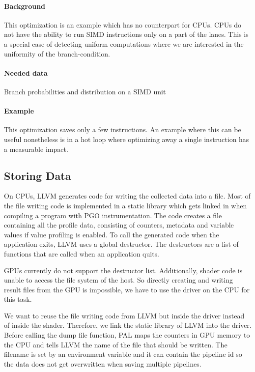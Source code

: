 \paragraph{Background} This optimization is an example which has no counterpart for CPUs. CPUs do not have the ability to run SIMD instructions only on a part of the lanes. This is a special case of detecting uniform computations where we are interested in the uniformity of the branch-condition.
\paragraph{Needed data} Branch probabilities and distribution on a SIMD unit
\paragraph{Example} This optimization saves only a few instructions. An example where this can be useful nonetheless is in a hot loop where optimizing away a single instruction has a measurable impact.

\subsection{Storing Data}
\label{sub:save-design}
On CPUs, LLVM generates code for writing the collected data into a file.
Most of the file writing code is implemented in a static library which gets linked in when compiling a program with PGO instrumentation.
The code creates a file containing all the profile data, consisting of counters, metadata and variable values if value profiling is enabled.
To call the generated code when the application exits, LLVM uses a global destructor.
The destructors are a list of functions that are called when an application quits.

GPUs currently do not support the destructor list. Additionally, shader code is unable to access the file system of the host.
So directly creating and writing result files from the GPU is impossible, we have to use the driver on the CPU for this task.

We want to reuse the file writing code from LLVM but inside the driver instead of inside the shader.
Therefore, we link the static library of LLVM into the driver.
Before calling the dump file function, PAL maps the counters in GPU memory to the CPU and tells LLVM the name of the file that should be written.
The filename is set by an environment variable and it can contain the pipeline id so the data does not get overwritten when saving multiple pipelines.

